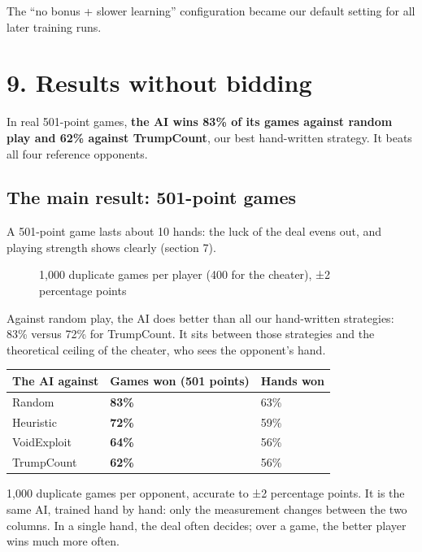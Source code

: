 The ``no bonus + slower learning'' configuration became our default setting for all later training runs.

\section*{9. Results without bidding}

In real 501-point games, \textbf{the AI wins 83\% of its games against random play and 62\% against TrumpCount}, our best hand-written strategy. It beats all four reference opponents.

\subsection*{The main result: 501-point games}

A 501-point game lasts about 10 hands: the luck of the deal evens out, and playing strength shows clearly (section 7).

\begin{figure}[H]\centering\caption{1,000 duplicate games per player (400 for the cheater), ±2 percentage points}\end{figure}

Against random play, the AI does better than all our hand-written strategies: 83\% versus 72\% for TrumpCount. It sits between those strategies and the theoretical ceiling of the cheater, who sees the opponent's hand.

\begin{table}[htbp]\centering\small\begin{tabular}{lll}\toprule

The AI against & \textbf{Games won (501 points)} & Hands won \\\midrule

Random & \textbf{83\%} & 63\% \\

Heuristic & \textbf{72\%} & 59\% \\

VoidExploit & \textbf{64\%} & 56\% \\

TrumpCount & \textbf{62\%} & 56\% \\

\bottomrule\end{tabular}\end{table}

1,000 duplicate games per opponent, accurate to ±2 percentage points. It is the same AI, trained hand by hand: only the measurement changes between the two columns. In a single hand, the deal often decides; over a game, the better player wins much more often.

